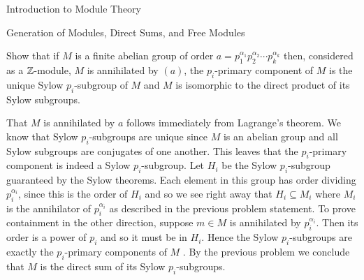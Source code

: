 \begin{chapter}{Introduction to Module Theory}
\begin{section}{Generation of Modules, Direct Sums, and Free Modules}
\begin{solution}
 
  


 
\end{solution}\oneperpage



\begin{problem}\label{ex:10.3.19}
Show that if $M$ is a finite abelian group of order $a=p_1^{\alpha_1}p_2^{\alpha_2}\cdots p_k^{\alpha_k}$ then, considered as a $\mathbb{Z}$-module, $M$ is annihilated by $(a)$, the $p_i$-primary component of $M$ is the unique Sylow $p_i$-subgroup of $M$ and $M$ is isomorphic to the direct product of its Sylow subgroups.
\end{problem}
\begin{solution}That $M$ is annihilated by $a$ follows immediately from Lagrange's theorem. We know that Sylow $p_i$-subgroups are unique since $M$ is an abelian group and all Sylow subgroups are conjugates of one another. This leaves that the $p_i$-primary component is indeed a Sylow $p_i$-subgroup. Let $H_i$ be the Sylow $p_i$-subgroup guaranteed by the Sylow theorems. Each element in this group has order dividing $p_i^{\alpha_i}$, since this is the order of $H_i$ and so we see right away that $H_i\subseteq M_i$ where $M_i$ is the annihilator of $p_i^{\alpha_i}$ as described in the previous problem statement. To prove containment in the other direction, suppose $m\in M$ is annihilated by $p_i^{\alpha_i}$. Then its order is a power of $p_i$ and so it must be in $H_i$. Hence the Sylow $p_i$-subgroups are exactly the $p_i$-primary components of $M$ . By the previous problem we conclude that $M$ is the direct sum of its Sylow $p_i$-subgroups.

\end{solution}\oneperpage




\end{section}
\end{chapter}

